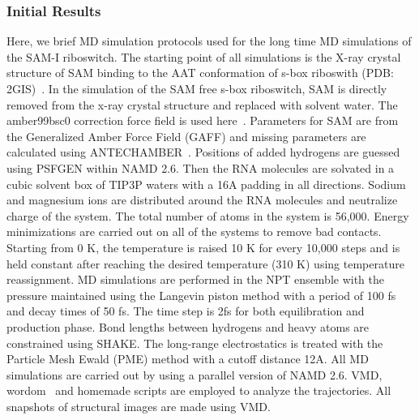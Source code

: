 \documentclass[a4paper,10pt]{article}
\begin{document}
\subsubsection*{Initial Results}

Here, we brief MD simulation protocols used for the long time MD simulations of the SAM-I riboswitch.  The starting point of all simulations is the X-ray crystal structure of SAM binding to the AAT conformation 
of s-box riboswith (PDB: 2GIS)~\cite{montange}. In the simulation of the SAM free s-box riboswitch, SAM 
is directly removed from the x-ray crystal structure and replaced with solvent water. The amber99bsc0
correction force field is used here~\cite{alberto}. Parameters for SAM are from the Generalized Amber 
Force Field (GAFF) and missing parameters are calculated using ANTECHAMBER~\cite{wang}. Positions 
of added hydrogens are guessed using PSFGEN within NAMD 2.6. Then the RNA molecules are solvated 
in a cubic solvent box of TIP3P waters with a 16A padding in all directions. Sodium and magnesium ions 
are distributed around the RNA molecules and neutralize charge of the 
system. The total number of atoms in the system is 56,000. Energy minimizations are carried out on all of the systems to remove bad contacts. Starting from 
0 K, the temperature is raised 10 K for every 10,000 steps and is held constant after reaching the desired 
temperature (310 K) using temperature reassignment. MD simulations are performed in the NPT ensemble 
with the pressure maintained using the Langevin piston method with a period of 100 fs and decay times of 
50 fs. The time step is 2fs for both equilibration and production phase. Bond lengths between hydrogens 
and heavy atoms are constrained using SHAKE. The long-range electrostatics is treated with the Particle 
Mesh Ewald (PME) method with a cutoff distance 12A.  All MD simulations are carried out by using a parallel version of NAMD 2.6.  VMD, wordom~\cite{moe} and homemade scripts are employed to analyze the trajectories. All snapshots 
of structural images are made using VMD.

\end{document}
